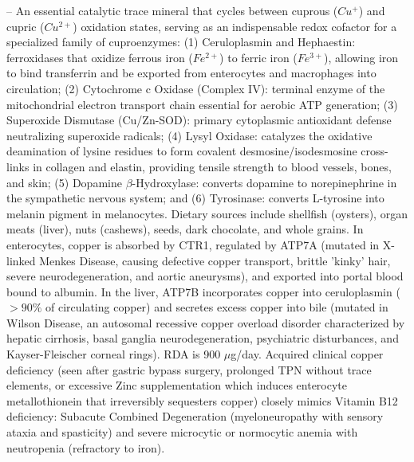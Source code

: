 -- An essential catalytic trace mineral that cycles between cuprous ($Cu^+$) and cupric ($Cu^{2+}$) oxidation states, serving as an indispensable redox cofactor for a specialized family of cuproenzymes: (1) Ceruloplasmin and Hephaestin: ferroxidases that oxidize ferrous iron ($Fe^{2+}$) to ferric iron ($Fe^{3+}$), allowing iron to bind transferrin and be exported from enterocytes and macrophages into circulation; (2) Cytochrome c Oxidase (Complex IV): terminal enzyme of the mitochondrial electron transport chain essential for aerobic ATP generation; (3) Superoxide Dismutase (Cu/Zn-SOD): primary cytoplasmic antioxidant defense neutralizing superoxide radicals; (4) Lysyl Oxidase: catalyzes the oxidative deamination of lysine residues to form covalent desmosine/isodesmosine cross-links in collagen and elastin, providing tensile strength to blood vessels, bones, and skin; (5) Dopamine $\beta$-Hydroxylase: converts dopamine to norepinephrine in the sympathetic nervous system; and (6) Tyrosinase: converts L-tyrosine into melanin pigment in melanocytes. Dietary sources include shellfish (oysters), organ meats (liver), nuts (cashews), seeds, dark chocolate, and whole grains. In enterocytes, copper is absorbed by CTR1, regulated by ATP7A (mutated in X-linked Menkes Disease, causing defective copper transport, brittle 'kinky' hair, severe neurodegeneration, and aortic aneurysms), and exported into portal blood bound to albumin. In the liver, ATP7B incorporates copper into ceruloplasmin ($>90\%$ of circulating copper) and secretes excess copper into bile (mutated in Wilson Disease, an autosomal recessive copper overload disorder characterized by hepatic cirrhosis, basal ganglia neurodegeneration, psychiatric disturbances, and Kayser-Fleischer corneal rings). RDA is 900 $\mu$g/day. Acquired clinical copper deficiency (seen after gastric bypass surgery, prolonged TPN without trace elements, or excessive Zinc supplementation which induces enterocyte metallothionein that irreversibly sequesters copper) closely mimics Vitamin B12 deficiency: Subacute Combined Degeneration (myeloneuropathy with sensory ataxia and spasticity) and severe microcytic or normocytic anemia with neutropenia (refractory to iron).

